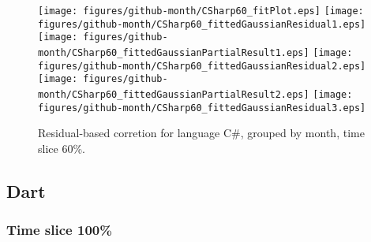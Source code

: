 \begin{figure}[hb]
\centering
{}
{\texttt{[image: figures/github-month/CSharp60\_fitPlot.eps]}}
{\texttt{[image: figures/github-month/CSharp60\_fittedGaussianResidual1.eps]}}
{\texttt{[image: figures/github-month/CSharp60\_fittedGaussianPartialResult1.eps]}}
{\texttt{[image: figures/github-month/CSharp60\_fittedGaussianResidual2.eps]}}
{\texttt{[image: figures/github-month/CSharp60\_fittedGaussianPartialResult2.eps]}}
{\texttt{[image: figures/github-month/CSharp60\_fittedGaussianResidual3.eps]}}
\caption{Residual-based corretion for language C\#, grouped by month, time slice 60\%.}
\end{figure}


\clearpage 
\newpage 


\subsection{Dart}

\FloatBarrier

\subsubsection{Time slice 100\%}

